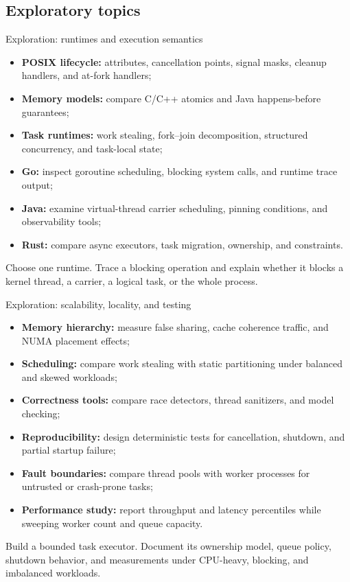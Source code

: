 \documentclass[aspectratio=169,11pt]{beamer}
\newcommand{\code}[1]{\texttt{\detokenize{#1}}}
\begin{document}
\subsection{Exploratory topics}

\begin{frame}{Exploration: runtimes and execution semantics}
  \begin{itemize}
    \item \textbf{POSIX lifecycle:} attributes, cancellation points, signal masks, cleanup handlers, and at-fork handlers;
    \item \textbf{Memory models:} compare C/C++ atomics and Java happens-before guarantees;
    \item \textbf{Task runtimes:} work stealing, fork--join decomposition, structured concurrency, and task-local state;
    \item \textbf{Go:} inspect goroutine scheduling, blocking system calls, and runtime trace output;
    \item \textbf{Java:} examine virtual-thread carrier scheduling, pinning conditions, and observability tools;
    \item \textbf{Rust:} compare async executors, task migration, ownership, and \code{Send} constraints.
  \end{itemize}
  \begin{tcolorbox}[title=Mini-investigation,colback=osorange!5,colframe=osorange!70]
    Choose one runtime. Trace a blocking operation and explain whether it blocks a kernel thread, a carrier, a logical task, or the whole process.
  \end{tcolorbox}
\end{frame}

\begin{frame}{Exploration: scalability, locality, and testing}
  \small
  \begin{itemize}
    \item \textbf{Memory hierarchy:} measure false sharing, cache coherence traffic, and NUMA placement effects;
    \item \textbf{Scheduling:} compare work stealing with static partitioning under balanced and skewed workloads;
    \item \textbf{Correctness tools:} compare race detectors, thread sanitizers, and model checking;
    \item \textbf{Reproducibility:} design deterministic tests for cancellation, shutdown, and partial startup failure;
    \item \textbf{Fault boundaries:} compare thread pools with worker processes for untrusted or crash-prone tasks;
    \item \textbf{Performance study:} report throughput and latency percentiles while sweeping worker count and queue capacity.
  \end{itemize}
  \begin{tcolorbox}[title=Suggested project,colback=osgreen!5,colframe=osgreen!70]
    Build a bounded task executor. Document its ownership model, queue policy, shutdown behavior, and measurements under CPU-heavy, blocking, and imbalanced workloads.
  \end{tcolorbox}
\end{frame}
\end{document}
